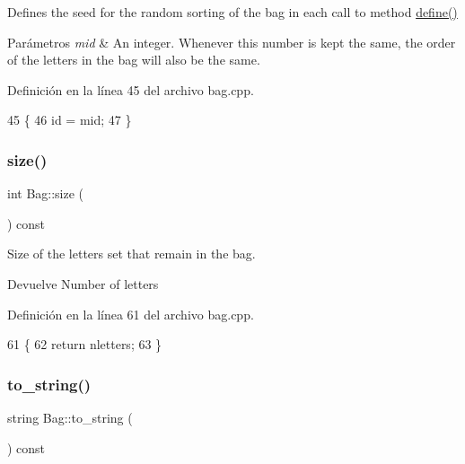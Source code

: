 Defines the seed for the random sorting of the bag in each call to method \hyperlink{classBag_ad380d36f2628b3ffe0ca19cfe53d7c19}{define()} 


\begin{DoxyParams}{Parámetros}
{\em mid} & An integer. Whenever this number is kept the same, the order of the letters in the bag will also be the same. \\
\hline
\end{DoxyParams}


Definición en la línea 45 del archivo bag.\+cpp.


\begin{DoxyCode}
45                            \{
46     \textcolor{keywordtype}{id} = mid;
47 \}
\end{DoxyCode}
\mbox{\label{classBag_a32652be363a0f5d189b029ed863e5bf2}} 
\subsubsection{\texorpdfstring{size()}{size()}}
{\footnotesize\ttfamily int Bag\+::size (\begin{DoxyParamCaption}{ }\end{DoxyParamCaption}) const}



Size of the letters set that remain in the bag. 

\begin{DoxyReturn}{Devuelve}
Number of letters 
\end{DoxyReturn}


Definición en la línea 61 del archivo bag.\+cpp.


\begin{DoxyCode}
61                     \{
62     \textcolor{keywordflow}{return} nletters;
63 \}
\end{DoxyCode}
\mbox{\label{classBag_ac63bdc8c3ceed6d86db66b9d399764ab}} 
\subsubsection{\texorpdfstring{to\+\_\+string()}{to\_string()}}
{\footnotesize\ttfamily string Bag\+::to\+\_\+string (\begin{DoxyParamCaption}{ }\end{DoxyParamCaption}) const}



